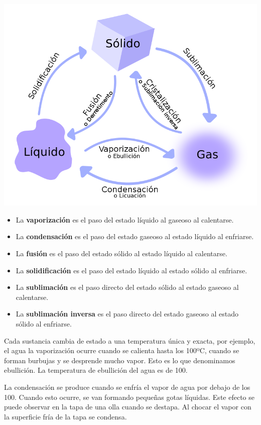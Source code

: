 \begin{center}
\includegraphics[scale=0.5]{imagenes/cambiosEstado} 
\end{center}


\begin{itemize}
\item La \textbf{vaporización} es el paso del estado líquido al gaseoso al calentarse.
\item La \textbf{condensación} es el paso del estado gaseoso al estado líquido al enfriarse.
\item La \textbf{fusión} es el paso del estado sólido al estado líquido al calentarse.
\item La \textbf{solidificación} es el paso del estado líquido al estado sólido al enfriarse.
\item La \textbf{sublimación} es el paso directo del estado sólido al estado gaseoso al calentarse.
\item La \textbf{sublimación inversa} es el paso directo del estado gaseoso al estado sólido al enfriarse.
\end{itemize}

Cada sustancia cambia de estado a una temperatura única y exacta, por ejemplo, el agua la vaporización ocurre cuando se calienta hasta los 100ºC, cuando se forman burbujas y se desprende mucho vapor. Esto es lo que denominamos ebullición. La temperatura de ebullición del agua es de 100\textdegree .

La condensación se produce cuando se enfría el vapor de agua por debajo de los 100\textdegree . Cuando esto ocurre, se van formando pequeñas gotas líquidas. Este efecto se puede observar en la tapa de una olla cuando se destapa. Al chocar el vapor con la superficie fría de la tapa se condensa.


